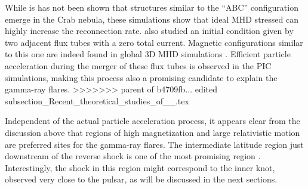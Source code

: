 While is has not been shown that structures similar to the ``ABC'' configuration emerge in the Crab nebula, these simulations show that ideal MHD stressed can highly increase the reconnection rate. \citet{2016arXiv160305731L} also studied an initial condition given by two adjacent flux tubes with a zero total current. Magnetic configurations similar to this one are indeed found in global 3D MHD simulations \cite{PorthKomissarov2014a}. Efficient particle acceleration during the merger of these flux tubes is observed in the PIC simulations, making this process also a promising candidate to explain the gamma-ray flares. 
>>>>>>> parent of b4709fb... edited subsection_Recent_theoretical_studies_of__.tex

Independent of the actual particle acceleration process, it appears clear from the discussion above that regions of high magnetization and large relativistic motion are preferred sites for the gamma-ray flares. The intermediate latitude region just downstream of the reverse shock is one of the most promising region \citet{2016arXiv160305731L}. Interestingly, the shock in this region might correspond to the inner knot, observed very close to the pulsar, as will be discussed in the next sections. 